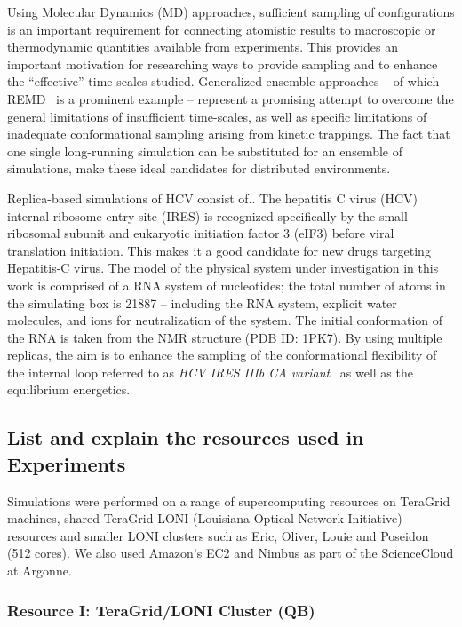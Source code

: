 \documentclass[conference,final]{IEEEtran}
\begin{document}
Using Molecular Dynamics (MD) approaches, sufficient sampling of
configurations is an important requirement for connecting atomistic
results to macroscopic or thermodynamic quantities available from
experiments. This provides an important motivation for researching
ways to provide sampling and to enhance the ``effective'' time-scales
studied.  Generalized ensemble approaches -- of which
REMD~\cite{Sugita:1999rm} is a prominent example -- represent a
promising attempt to overcome the general limitations of insufficient
time-scales, as well as specific limitations of inadequate
conformational sampling arising from kinetic trappings.  The fact that
one single long-running simulation can be substituted for an ensemble
of simulations, make these ideal candidates for distributed
environments.

Replica-based simulations of HCV consist of..  The hepatitis C virus
(HCV) internal ribosome entry site (IRES) is recognized specifically
by the small ribosomal subunit and eukaryotic initiation factor 3
(eIF3) before viral translation initiation.  This makes it a good
candidate for new drugs targeting Hepatitis-C virus.  The model of the
physical system under investigation in this work is comprised of a RNA
system of nucleotides; the total number of atoms in the simulating box
is 21887 -- including the RNA system, explicit water molecules, and
ions for neutralization of the system.  The initial conformation of
the RNA is taken from the NMR structure (PDB ID: 1PK7).  By using
multiple replicas, the aim is to enhance the sampling of the
conformational flexibility of the internal loop referred to as {\it
  HCV IRES IIIb CA variant}~\cite{Collier:2002wd} as well as the
equilibrium energetics.

\subsection{List and explain the resources used in Experiments}

Simulations were performed on a range of supercomputing resources on
TeraGrid machines, shared TeraGrid-LONI (Louisiana Optical Network
Initiative)~\cite{LONI_web} resources and smaller LONI clusters such
as Eric, Oliver, Louie and Poseidon (512 cores).  We also used
Amazon's EC2 and Nimbus as part of the ScienceCloud at Argonne.

\subsubsection*{Resource I: TeraGrid/LONI Cluster (QB)}
\end{document}
